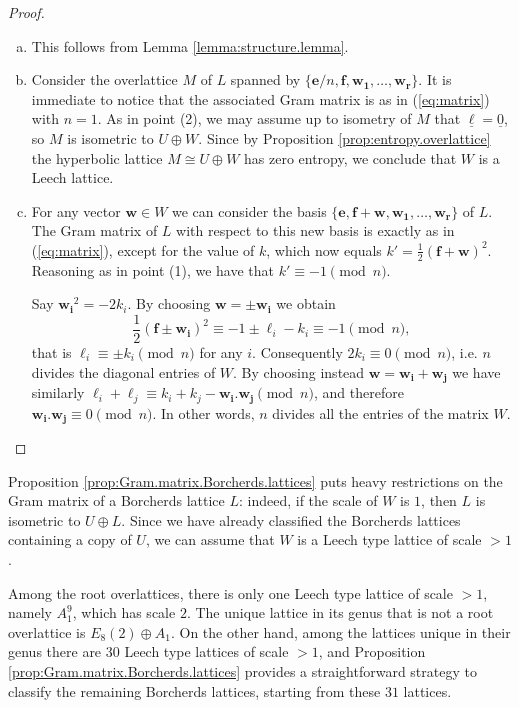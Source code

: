 \documentclass[11pt,letterpaper]{amsart}
\newcommand{\vect}[1]{\boldsymbol{#1}}
\begin{document}
\begin{proof}
\begin{enumerate}[(a)]
    \item This follows from Lemma \ref{lemma:structure.lemma}.
    
    \item Consider the overlattice $M$ of $L$ spanned by $\{\vect{e}/n,\vect{f},\vect{w_1},\ldots,\vect{w_r}\}$. It is immediate to notice that the associated Gram matrix is as in (\ref{eq:matrix}) with $n=1$. As in point (2), we may assume up to isometry of $M$ that $\underline{\ell}=\underline{0}$, so $M$ is isometric to $U\oplus W$. Since by Proposition \ref{prop:entropy.overlattice} the hyperbolic lattice $M\cong U\oplus W$ has zero entropy, we conclude that $W$ is a Leech lattice.
    
    \item For any vector $\vect{w}\in W$ we can consider the basis $\{\vect{e},\vect{f}+\vect{w},\vect{w_1},\ldots,\vect{w_r}\}$ of $L$. The Gram matrix of $L$ with respect to this new basis is exactly as in (\ref{eq:matrix}), except for the value of $k$, which now equals $k'=\frac{1}{2}(\vect{f}+\vect{w})^2$. Reasoning as in point (1), we have that $k'\equiv -1 \pmod{n}$.
    
    Say $\vect{w_i}^2=-2k_i$. By choosing $\vect{w}=\pm \vect{w_i}$ we obtain
    $$\frac{1}{2}(\vect{f}\pm \vect{w_i})^2 \equiv -1 \pm \ell_i - k_i \equiv -1 \pmod{n},$$
    that is $\ell_i\equiv \pm k_i \pmod{n}$ for any $i$. Consequently $2k_i \equiv 0 \pmod{n}$, i.e. $n$ divides the diagonal entries of $W$.
    By choosing instead $\vect{w}=\vect{w_i}+\vect{w_j}$ we have similarly $\ell_i+\ell_j \equiv k_i + k_j - \vect{w_i}.\vect{w_j} \pmod{n}$, and therefore $\vect{w_i}.\vect{w_j} \equiv 0 \pmod{n}$. In other words, $n$ divides all the entries of the matrix $W$.
    \end{enumerate}
   
\end{proof}

Proposition \ref{prop:Gram.matrix.Borcherds.lattices} puts heavy restrictions on the Gram matrix of a Borcherds lattice $L$: indeed, 
if the scale of $W$ is $1$, then $L$ is isometric to $U\oplus L$.
Since we have already classified the Borcherds lattices containing a copy of $U$, we can assume that $W$ is a Leech type lattice of scale $>1$.

Among the root overlattices, there is only one Leech type lattice of scale $>1$, namely $A_1^9$, which has scale $2$. The unique lattice in its genus that is not a root overlattice is $E_8(2)\oplus A_1$. On the other hand, among the lattices unique in their genus there are $30$ Leech type lattices of scale $>1$, and Proposition \ref{prop:Gram.matrix.Borcherds.lattices} provides a straightforward strategy to classify the remaining Borcherds lattices, starting from these $31$ lattices.
\end{document}
